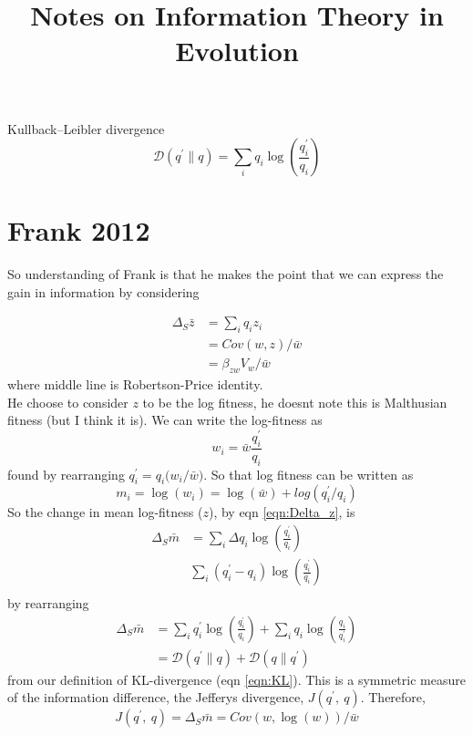 \documentclass[a4paper,10pt]{article}
\begin{document}
\title{Notes on Information Theory in Evolution }


\date{}


\maketitle

Kullback–Leibler divergence 
\begin{equation}
\mathscr{D}(q^{\prime} \|  q) = \sum_i q_i \log \left( \frac{q_i^{\prime}}{q_i} \right)  \label{eqn:KL}
\end{equation}
\section{Frank 2012}
So understanding of Frank is that he makes the point that we can
express the gain in information by considering 

\begin{align}
\Delta_S \bar{z} &= \sum_i q_i z_i \label{eqn:Delta_z}\\
&= Cov(w,z) / \bar{w} \\
&=\beta_{zw} V_w /\bar{w}
\end{align}
where middle line is Robertson-Price identity.\\

He choose to consider $z$ to be the log fitness, he doesnt note this is
Malthusian fitness (but I think it is).  We can write the log-fitness
as 
\begin{equation}
w_i = \bar{w}\frac{q_i^{\prime}}{q_i}
\end{equation} 
found by rearranging $q_i^{\prime} = q_i \big(w_i/\bar{w}\big)$. So that log
fitness can be written as 
\begin{equation}
m_i = \log(w_i) = \log(\bar{w}) + log(q_i^{\prime}/q_i)
\end{equation}
So the change in mean log-fitness ($z$), by eqn \eqref{eqn:Delta_z}, is
\begin{align}
\Delta_S \bar{m} &= \sum_i \Delta q_i \log \left( \frac{q_i^{\prime}}{q_i}
\right) \\
&\sum_i  (q_i^{\prime} - q_i) \log \left( \frac{q_i^{\prime}}{q_i} \right)\\
\end{align}
by rearranging 
\begin{align}
\Delta_S \bar{m} &= \sum_i  q_i^{\prime} \log \left(
  \frac{q_i^{\prime}}{q_i} \right) +
  \sum_i  q_i \log \left( \frac{q_i}{q_i^{\prime}} \right)\\
& = \mathscr{D}(q^{\prime} \|  q)  + \mathscr{D}(q \|  q^{\prime})
\end{align}
from our definition of KL-divergence (eqn \eqref{eqn:KL}). This is a
symmetric measure of the information difference, the Jefferys
divergence, $J(q^{\prime},~q)$. Therefore,
\begin{equation}
J(q^{\prime},~q) = \Delta_S \bar{m} =  Cov(w,\log(w)) / \bar{w} 
\end{equation}
\end{document}
